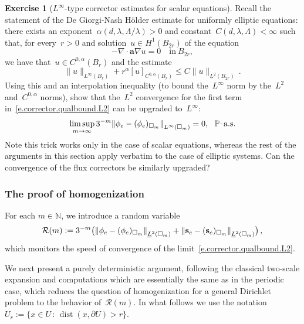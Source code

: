 \documentclass[11pt]{article} %
\let\oldsquare\square %
\renewcommand{\square}{\oldsquare}
\numberwithin{equation}{section}
\theoremstyle{definition}
\newtheorem{exercise}[theorem]{Exercise}
\let\originalleft\left
\let\originalright\right
\renewcommand{\left}{\mathopen{}\mathclose\bgroup\originalleft}
\renewcommand{\right}{\aftergroup\egroup\originalright}
\newcommand*{\N}{\ensuremath{\mathbb{N}}}
\newcommand{\s}{\mathbf{s}}
\renewcommand{\a}{\mathbf{a}}
\newcommand{\cu}{\square}
\renewcommand{\P}{\mathbb{P}}
\DeclareMathOperator{\dist}{dist}
\begin{document}
\begin{exercise}[$L^\infty$-type corrector estimates for scalar equations]
Recall the statement of the De Giorgi-Nash H\"older estimate for uniformly elliptic equations: there exists an exponent~$\alpha(d,\lambda,\Lambda/\lambda)>0$ and constant~$C(d,\lambda,\Lambda)<\infty$ such that,  for every~$r>0$ and solution~$u\in H^1(B_{2r})$ of the equation
\begin{equation*}
-\nabla \cdot \a\nabla u = 0 \quad \mbox{in} \ B_{2r}, 
\end{equation*}
we have that~$u \in C^{0,\alpha}(B_r)$ and the estimate
\begin{equation*}
\| u \|_{L^\infty(B_r)} + r^\alpha [ u ]_{C^{0,\alpha}(B_r)} 
\leq 
C \| u \|_{\underline{L}^2 (B_{2r})} 
\,.
\end{equation*}
Using this and an interpolation inequality (to bound the~$L^\infty$ norm by the~$L^2$ and~$C^{0,\alpha}$ norms), show that the~$L^2$ convergence for the first term in~\eqref{e.corrector.qualbound.L2} can be upgraded to~$L^\infty$:
\begin{equation}
\label{e.corrector.qualbound.Linfty}
\limsup_{m\to \infty}
3^{-m} 
\left\|  \phi_e - (\phi_e)_{\cu_m} \right\|_{L^\infty(\cu_m)} = 0,
\ \ \mbox{$\P$--a.s.}
\end{equation}
Note this trick works only in the case of scalar equations, whereas the rest of the arguments in this section apply verbatim to the case of elliptic systems. 
Can the convergence of the flux correctors be similarly upgraded?
\end{exercise}




\subsubsection{The proof of homogenization}

For each $m\in\N$, we introduce a random variable 
\begin{equation}
\label{e.Rm.def}
\mathcal{R}(m) :=
3^{-m} 
\bigl(
\left\|  \phi_e - (\phi_e)_{\cu_m} \right\|_{\underline{L}^{2}(\cu_m)}
+
\left\|  \s_e - (\s_e)_{\cu_m} \right\|_{\underline{L}^{2}(\cu_m)}
\bigr) \,,
\end{equation}
which monitors the speed of convergence of the limit~\eqref{e.corrector.qualbound.L2}. 

\smallskip 

We next present a purely deterministic argument, following the classical two-scale expansion and computations which are essentially the same as in the periodic case, which reduces the question of homogenization for a general Dirichlet problem to the behavior of~$\mathcal{R}(m)$. 
In what follows we use the notation~$U_r := \{x \in U \, : \, \dist(x,\partial U)> r\}$.
\end{document}
